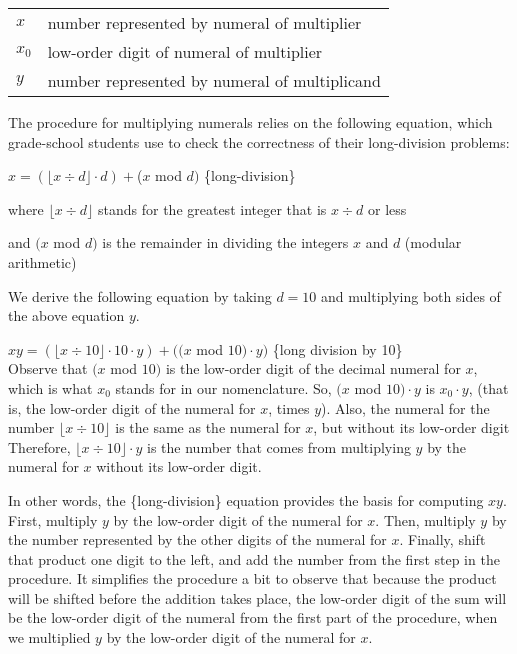\begin{tabular}{ll}
$x$       & number represented by numeral of multiplier \\
$x_0$     & low-order digit of numeral of multiplier  \\
$y$       & number represented by numeral of multiplicand  \\
\end{tabular}

The procedure for multiplying numerals relies on the following equation,
which grade-school students use to check the correctness of their long-division problems:

\hspace{2mm} $x = (\lfloor x \div d \rfloor \cdot d) + $($x$ mod $d)$ \hfill \{long-division\}

\hspace{2mm} where $\lfloor x \div d \rfloor$ stands for the greatest integer that is $x \div d$ or less

\hspace{2mm} and $(x$ mod $d)$ is the remainder in dividing the integers $x$ and $d$ (modular arithmetic)

We derive the following equation by taking $d = 10$ and
 multiplying both sides of the above equation $y$.

\hspace{2cm} $xy = (\lfloor x \div 10 \rfloor \cdot 10 \cdot y) + ((x$ mod $10) \cdot y)$
\hfill \{long division by 10\} \\

Observe that $(x$ mod $10)$ is the low-order digit
of the decimal numeral for $x$, which is what $x_0$ stands for
in our nomenclature.
So, $(x$ mod $10) \cdot y$ is $x_0 \cdot y$,
(that is, the low-order digit of the numeral for $x$, times $y$).
Also, the numeral for the number
$\lfloor x \div 10 \rfloor$ is the same as the numeral for $x$, but
without its low-order digit
Therefore, $\lfloor x \div 10 \rfloor \cdot y$ is the number that
comes from multiplying $y$ by the numeral for $x$ without its low-order digit.

In other words, the \{long-division\} equation
provides the basis for computing $xy$.
First, multiply $y$ by the low-order
digit of the numeral for $x$.
Then, multiply $y$ by the number
represented by the other digits of the numeral for $x$.
Finally, shift that product one digit to the left,
and add the number from the first step in the procedure.
It simplifies the procedure a bit to observe that
because the product will be shifted before the addition takes place,
the low-order digit of the sum will be the low-order digit of
the numeral from the first part of the procedure,
when we multiplied $y$ by the low-order digit of the numeral for $x$.

